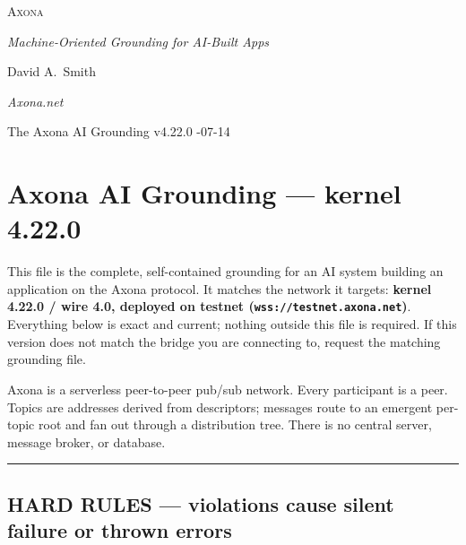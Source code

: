 \documentclass[
  nobib]{tufte-handout}
\author{}
\date{}
\begin{document}
\thispagestyle{empty}
\null\vfill
\begin{center}
{\fontsize{48}{52}\selectfont \textsc{Axona}\par}
\vspace{0.6em}
{\Large\itshape Machine-Oriented Grounding for AI-Built Apps\par}
\vspace{4em}
{\large David A.~Smith\par}
{\itshape\small Axona.net\par}
\vspace{2em}
{\small The Axona AI Grounding \quad v4.22.0 -07-14\par}
\end{center}
\vfill
\null
\newpage
\pagestyle{ndhtplain}
\thispagestyle{ndhtplain}
\setcounter{page}{1}

\section{Axona AI Grounding --- kernel
4.22.0}\label{axona-ai-grounding-kernel-4.22.0}

This file is the complete, self-contained grounding for an AI system
building an application on the Axona protocol. It matches the network it
targets: \textbf{kernel 4.22.0 / wire 4.0, deployed on testnet
(\texttt{wss://testnet.axona.net})}. Everything below is exact and
current; nothing outside this file is required. If this version does not
match the bridge you are connecting to, request the matching grounding
file.

Axona is a serverless peer-to-peer pub/sub network. Every participant is
a peer. Topics are addresses derived from descriptors; messages route to
an emergent per-topic root and fan out through a distribution tree.
There is no central server, message broker, or database.

\begin{center}\rule{0.5\linewidth}{0.5pt}\end{center}

\subsection{HARD RULES --- violations cause silent failure or thrown
errors}\label{hard-rules-violations-cause-silent-failure-or-thrown-errors}
\end{document}
